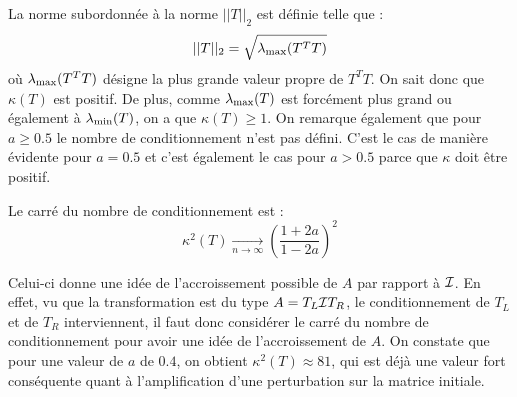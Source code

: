 La norme subordonnée à la norme $||T||_2$ est définie telle que :
$$||T||_2 = \sqrt{\lambda_\mathrm{max}(T^TT)}$$
où $\lambda_\mathrm{max}(T^TT)$ désigne la plus grande valeur propre de $T^TT$.
On sait donc que $\kappa(T) $ est positif.
De plus, comme $\lambda_\mathrm{max}(T)$ est forcément plus grand ou également à $\lambda_\mathrm{min}(T)$, on a que $\kappa(T) \geq 1$.
On remarque également que pour $a \geq 0.5$ le nombre de conditionnement n'est pas défini.
C'est le cas de manière évidente pour $a = 0.5$ et c'est également le cas pour $a > 0.5$ parce que $\kappa$ doit être positif.

Le carré du nombre de conditionnement est :
\begin{equation} \label{equatkappa}
	\kappa^2 (T) \underset{n\rightarrow \infty}{\longrightarrow} \left(\frac{1+2a}{1-2a}\right)^2
\end{equation}

Celui-ci donne une idée de l'accroissement possible de $A$ par rapport à $\mathcal{I}$.
En effet, vu que la transformation est du type $A = T_L \mathcal{I} T_R$,
le conditionnement de $T_L$ et de $T_R$ interviennent,
il faut donc considérer le carré du nombre de conditionnement pour avoir une idée de l'accroissement de $A$. On constate que pour une valeur de $a$ de $0.4$, on obtient $\kappa^2 (T) \approx 81$, qui est déjà une valeur fort conséquente quant à l'amplification d'une perturbation sur la matrice initiale.
